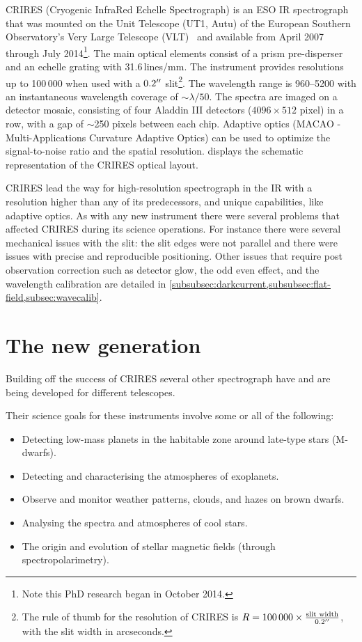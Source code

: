 CRIRES (Cryogenic InfraRed Echelle Spectrograph) is an {ESO} {IR} spectrograph that was mounted on the Unit Telescope (UT1, Autu) of the European Southern Observatory's Very Large Telescope (VLT)~\citep{kaeufl_crires_2004} and available from April 2007 through July 2014\footnote{Note this {PhD} research began in October 2014.}.
The main optical elements consist of a prism pre-disperser and an echelle grating with 31.6\,lines/mm.
The instrument provides resolutions up to 100\,000 when used with a \(0.2^{\prime\prime}\) slit\footnote{The rule of thumb for the resolution of {CRIRES} is \(R=100\,000 \times \frac{\textrm{slit width}}{0.2^{\prime\prime}}\), with the slit width in arcseconds.}.
The wavelength range is 960--5200\nm{} with an instantaneous wavelength coverage of \(\sim\lambda/50\).
The spectra are imaged on a detector mosaic, consisting of four Aladdin III detectors (\(4096 \times 512\) pixel) in a row, with a gap of \(\sim\)250 pixels between each chip.
Adaptive optics (MACAO - Multi-Applications Curvature Adaptive Optics) can be used to optimize the signal-to-noise ratio and the spatial resolution.
 displays the schematic representation of the {CRIRES} optical layout.

CRIRES lead the way for high-resolution spectrograph in the {IR} with a resolution higher than any of its predecessors, and unique capabilities, like adaptive optics.
As with any new instrument there were several problems that affected {CRIRES} during its science operations.
For instance there were several mechanical issues with the slit: the slit edges were not parallel and there were issues with precise and reproducible positioning.
Other issues that require post observation correction such as detector glow, the odd even effect, and the wavelength calibration are detailed in \cref{subsubsec:darkcurrent,subsubsec:flat-field,subsec:wavecalib}.


\section{The new generation}
\label{subsec:new_generation}
Building off the success of {CRIRES} several other \nir{} spectrograph have and are being developed for different telescopes.

Their science goals for these instruments involve some or all of the following:

\begin{itemize}
    \setlength\itemsep{-0.5em} %
    \item Detecting low-mass planets in the habitable zone around late-type stars (M-dwarfs).
    \item Detecting and characterising the atmospheres of exoplanets.
    \item Observe and monitor weather patterns, clouds, and hazes on brown dwarfs.
    \item Analysing the spectra and atmospheres of cool stars.
    \item The origin and evolution of stellar magnetic fields (through spectropolarimetry).
\end{itemize}

